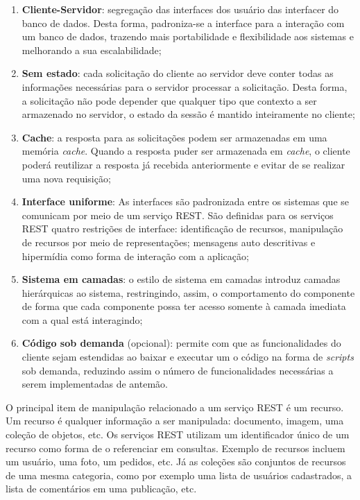 \begin{enumerate}
	\item \textbf{Cliente-Servidor}:  segregação das interfaces dos usuário das interfacer do banco de dados. Desta forma, padroniza-se a interface para a interação com um banco de dados, trazendo mais portabilidade e flexibilidade aos sistemas e melhorando a sua escalabilidade;

	\item \textbf{Sem estado}: cada solicitação do cliente ao servidor deve conter todas as informações necessárias para o servidor processar a solicitação. Desta forma, a solicitação não pode depender que qualquer tipo que contexto a ser armazenado no servidor, o estado da sessão é mantido inteiramente no cliente;

	\item \textbf{Cache}:  a resposta para as solicitações podem ser armazenadas em uma memória \textit{cache}. Quando a resposta puder ser armazenada em \textit{cache}, o cliente poderá reutilizar a resposta já recebida anteriormente e evitar de se realizar uma nova requisição;

	\item \textbf{Interface uniforme}: As interfaces são padronizada entre os sistemas que se comunicam por meio de um serviço REST. São definidas para os serviços REST quatro restrições de interface: identificação de recursos, manipulação de recursos por meio de representações; mensagens auto descritivas e hipermídia como forma de interação com a aplicação;

	\item \textbf{Sistema em camadas}: o estilo de sistema em camadas introduz camadas hierárquicas  ao sistema, restringindo, assim, o comportamento do componente de forma que cada componente possa ter acesso somente à camada imediata com a qual está interagindo;

	\item \textbf{Código sob demanda} (opcional): permite com que as funcionalidades do cliente sejam estendidas ao baixar e executar um o código na forma de \textit{scripts} sob demanda, reduzindo assim o número de funcionalidades necessárias a serem implementadas de antemão.
\end{enumerate}

O principal item de manipulação relacionado a um serviço REST é um recurso. Um recurso é qualquer informação a ser manipulada: documento, imagem, uma coleção de objetos, etc. Os serviços REST utilizam um identificador único de um recurso como forma de o referenciar em consultas. Exemplo de recursos incluem um usuário, uma foto, um pedidos, etc. Já as coleções são conjuntos de recursos de uma mesma categoria, como por exemplo uma  lista de usuários cadastrados, a lista de comentários em uma publicação, etc.

